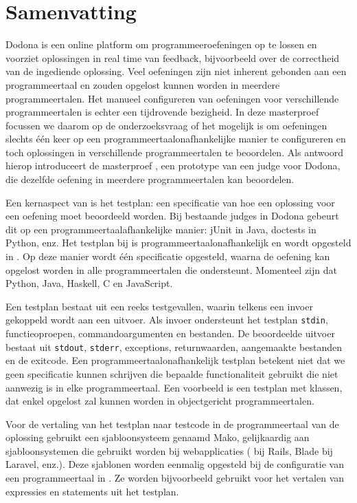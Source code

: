 \chapter*{Samenvatting}

Dodona is een online platform om programmeeroefeningen op te lossen en voorziet oplossingen in real time van feedback, bijvoorbeeld over de correctheid van de ingediende oplossing.
Veel oefeningen zijn niet inherent gebonden aan een programmeertaal en zouden opgelost kunnen worden in meerdere programmeertalen.
Het manueel configureren van oefeningen voor verschillende programmeertalen is echter een tijdrovende bezigheid.
In deze masterproef focussen we daarom op de onderzoeksvraag of het mogelijk is om oefeningen slechts één keer op een programmeertaalonafhankelijke manier te configureren en toch oplossingen in verschillende programmeertalen te beoordelen.
Als antwoord hierop introduceert de masterproef \tested{}, een prototype van een judge voor Dodona, die dezelfde oefening in meerdere programmeertalen kan beoordelen.

Een kernaspect van \tested{} is het testplan: een specificatie van hoe een oplossing voor een oefening moet beoordeeld worden.
Bij bestaande judges in Dodona gebeurt dit op een programmeertaalafhankelijke manier: jUnit in Java, doctests in Python, enz.
Het testplan bij \tested{} is programmeertaalonafhankelijk en wordt opgesteld in .
Op deze manier wordt één specificatie opgesteld, waarna de oefening kan opgelost worden in alle programmeertalen die \tested{} ondersteunt.
Momenteel zijn dat Python, Java, Haskell, C en JavaScript.

Een testplan bestaat uit een reeks testgevallen, waarin telkens een invoer gekoppeld wordt aan een uitvoer.
Als invoer ondersteunt het testplan \texttt{stdin}, functieoproepen, commandoargumenten en bestanden.
De beoordeelde uitvoer bestaat uit \texttt{stdout}, \texttt{stderr}, exceptions, returnwaarden, aangemaakte bestanden en de exitcode.
Een programmeertaalonafhankelijk testplan betekent niet dat we geen specificatie kunnen schrijven die bepaalde functionaliteit gebruikt die niet aanwezig is in elke programmeertaal.
Een voorbeeld is een testplan met klassen, dat enkel opgelost zal kunnen worden in objectgericht programmeertalen.

Voor de vertaling van het testplan naar testcode in de programmeertaal van de oplossing gebruikt \tested{} een sjabloonsysteem genaamd Mako, gelijkaardig aan sjabloonsystemen die gebruikt worden bij webapplicaties ( bij Rails, Blade bij Laravel, enz.).
Deze sjablonen worden eenmalig opgesteld bij de configuratie van een programmeertaal in \tested{}.
Ze worden bijvoorbeeld gebruikt voor het vertalen van expressies en statements uit het testplan.


